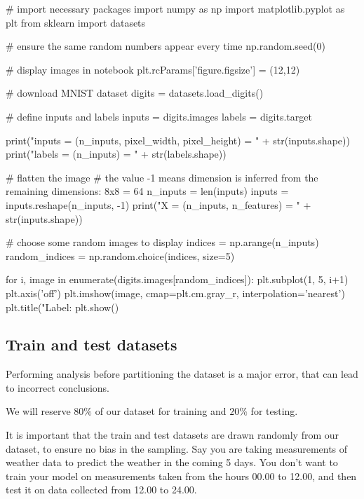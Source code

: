 \documentclass[%
oneside,                 %
final,                   %
10pt]{article}
\begin{document}
\bpycod
# import necessary packages
import numpy as np
import matplotlib.pyplot as plt
from sklearn import datasets


# ensure the same random numbers appear every time
np.random.seed(0)

# display images in notebook
plt.rcParams['figure.figsize'] = (12,12)


# download MNIST dataset
digits = datasets.load_digits()

# define inputs and labels
inputs = digits.images
labels = digits.target

print("inputs = (n_inputs, pixel_width, pixel_height) = " + str(inputs.shape))
print("labels = (n_inputs) = " + str(labels.shape))


# flatten the image
# the value -1 means dimension is inferred from the remaining dimensions: 8x8 = 64
n_inputs = len(inputs)
inputs = inputs.reshape(n_inputs, -1)
print("X = (n_inputs, n_features) = " + str(inputs.shape))


# choose some random images to display
indices = np.arange(n_inputs)
random_indices = np.random.choice(indices, size=5)

for i, image in enumerate(digits.images[random_indices]):
    plt.subplot(1, 5, i+1)
    plt.axis('off')
    plt.imshow(image, cmap=plt.cm.gray_r, interpolation='nearest')
    plt.title("Label: %
plt.show()

\epycod


\subsection{Train and test datasets}

Performing analysis before partitioning the dataset is a major error, that can lead to incorrect conclusions.  

We will reserve $80 \%$ of our dataset for training and $20 \%$ for testing.  

It is important that the train and test datasets are drawn randomly from our dataset, to ensure
no bias in the sampling.  
Say you are taking measurements of weather data to predict the weather in the coming 5 days.
You don't want to train your model on measurements taken from the hours 00.00 to 12.00, and then test it on data
collected from 12.00 to 24.00.
\end{document}
